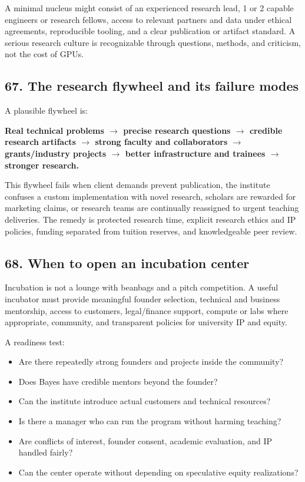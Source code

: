 A minimal nucleus might consist of an experienced research lead, 1 or 2 capable engineers or research fellows, access to relevant partners and data under ethical agreements, reproducible tooling, and a clear publication or artifact standard. A serious research culture is recognizable through questions, methods, and criticism, not the cost of GPUs.

\subsection{67. The research flywheel and its failure modes}

A plausible flywheel is:

\textbf{Real technical problems $\rightarrow$ precise research questions $\rightarrow$ credible research artifacts $\rightarrow$ strong faculty and collaborators $\rightarrow$ grants/\allowbreak industry projects $\rightarrow$ better infrastructure and trainees $\rightarrow$ stronger research.}

This flywheel fails when client demands prevent publication, the institute confuses a custom implementation with novel research, scholars are rewarded for marketing claims, or research teams are continually reassigned to urgent teaching deliveries. The remedy is protected research time, explicit research ethics and IP policies, funding separated from tuition reserves, and knowledgeable peer review.

\subsection{68. When to open an incubation center}

Incubation is not a lounge with beanbags and a pitch competition. A useful incubator must provide meaningful founder selection, technical and business mentorship, access to customers, legal/\allowbreak finance support, compute or labs where appropriate, community, and transparent policies for university IP and equity.

A readiness test:

\begin{itemize}[leftmargin=*,itemsep=1.5pt]
  \item Are there repeatedly strong founders and projects inside the community?
  \item Does Bayes have credible mentors beyond the founder?
  \item Can the institute introduce actual customers and technical resources?
  \item Is there a manager who can run the program without harming teaching?
  \item Are conflicts of interest, founder consent, academic evaluation, and IP handled fairly?
  \item Can the center operate without depending on speculative equity realizations?
\end{itemize}


